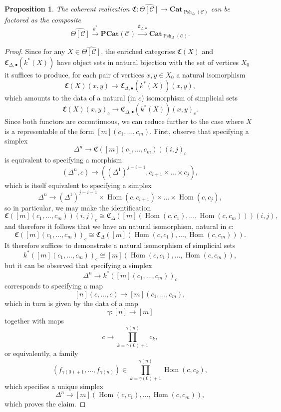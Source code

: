 \documentclass{amsart}
\numberwithin{equation}{section}
\theoremstyle{plain}   %
\newtheorem{prop}[subsection]{Proposition}
\theoremstyle{remark}
\theoremstyle{plain}
\newcommand{\Cat}{\ensuremath{\mathbf{Cat}}}
\DeclareMathOperator{\Hom}{Hom}
\newcommand{\C}{\ensuremath{\mathcal{C}}}
\newcommand{\cellset}{\ensuremath{\widehat{\Theta[\mathcal{C}]}}}
\newcommand{\spsh}{\ensuremath{\operatorname{Psh}_\Delta(\mathcal{C})}}
\begin{document}
\begin{prop}\label{pointwise}
	The coherent realization \(\mathfrak{C}:\cellset \to \Cat_{\spsh}\) can be factored as the composite 
	\[
		\cellset \xrightarrow{k^\ast} \mathbf{PCat}(\C) \xrightarrow{\mathfrak{C}_{\Delta,\bullet}} \Cat_{\spsh}.
	\] 
\end{prop}
\begin{proof} 
	Since for any \(X\in \cellset\), the enriched categories \(\mathfrak{C}(X)\) and \(\mathfrak{C}_{\Delta,\bullet}( k^\ast(X))\) have object sets in natural bijection with the set of vertices \(X_0\) it suffices to produce, for each pair of vertices \(x, y \in X_0\) a natural isomorphism
	\[
		\mathfrak{C}(X)(x, y) \to \mathfrak{C}_{\Delta,\bullet}( k^\ast(X))(x,y),
	\] 
	which amounts to the data of a natural (in \(c\)) isomorphism of simplicial sets
	\[
		\mathfrak{C}(X)(x, y)_{c} \to \mathfrak{C}_{\Delta,\bullet}( k^\ast(X))(x,y)_{c}.
	\] 
	Since both functors are cocontinuous, we can reduce further to the case where \(X\) is a representable of the form \([m](c_1,\dots,c_m)\). 
	First, observe that specifying a simplex 
	\[
		\Delta^n \to \mathfrak{C}([m](c_1,\dots,c_m))(i, j)_{c}
	\]
	is equivalent to specifying a morphism 
	\[
		(\Delta^n, c)\to ((\Delta^1)^{j-i-1}, c_{i+1}\times \dots\times c_j),
	\]
	which is itself equivalent to specifying a simplex
	\[
		\Delta^n \to (\Delta^1)^{j-i-1} \times \Hom(c,c_{i+1}) \times \dots \times \Hom(c,c_j),
	\]
	so in particular, we may make the identification
	\[
		\mathfrak{C}([m](c_1,\dots,c_m))(i, j)_{c} \cong \mathfrak{C}_\Delta([m](\Hom(c,c_1),\dots,\Hom(c,c_m)))(i, j),
	\]
	and therefore it follows that we have an natural isomorphism, natural in \(c\):
	\[
		\mathfrak{C}([m](c_1,\dots,c_m))_{c} \cong \mathfrak{C}_\Delta([m](\Hom(c,c_1),\dots,\Hom(c,c_m))).
	\]
	It therefore suffices to demonstrate a natural isomorphism of simplicial sets
	\[
		k^\ast([m](c_1,\dots,c_m))_c\cong [m](\Hom(c,c_1),\dots,\Hom(c,c_m)),
	\]
	but it can be observed that specifying a simplex 
	\[
		\Delta^n \to k^\ast([m](c_1,\dots,c_m))_c
	\]
	corresponds to specifying a map
	\[
		[n](c,\dots,c) \to [m](c_1,\dots,c_m),
	\]
	which in turn is given by the data of a map
	\[
		\gamma:[n]\to [m]
	\]
	together with maps 
	\[
		c\to \prod_{k=\gamma(0)+1}^{\gamma(n)} c_k,
	\]
	or equivalently, a family
	\[
		(f_{\gamma(0)+1}, \dots, f_{\gamma(n)}) \in \prod_{k=\gamma(0)+1}^{\gamma(n)} \Hom(c,c_k),
	\]
	which specifies a unique simplex 
	\[
		\Delta^n \to [m](\Hom(c,c_1),\dots,\Hom(c,c_m)),
	\]
	which proves the claim.
\end{proof}
\end{document}
